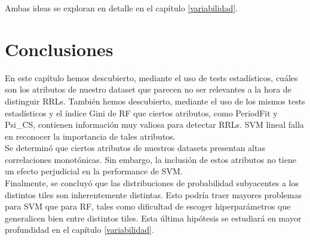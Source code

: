 Ambas ideas se exploran en detalle en el capítulo \ref{variabilidad}. 

\section{Conclusiones}

En este capítulo hemos descubierto, mediante el uso de tests estadísticos, cuáles son los atributos de nuestro dataset que parecen no ser relevantes a la hora de distinguir RRLs. También hemos descubierto, mediante el uso de los mismos tests estadísticos y el índice Gini de RF que ciertos atributos, como PeriodFit y Psi\_CS, contienen información muy valiosa para detectar RRLs. SVM lineal falla en reconocer la importancia de tales atributos. \\

Se determinó que ciertos atributos de nuestros datasets presentan altas correlaciones monotónicas. Sin embargo, la inclusión de estos atributos no tiene un efecto perjudicial en la performance de SVM. \\

Finalmente, se concluyó que las distribuciones de probabilidad subyacentes a los distintos tiles son inherentemente distintas. Esto podría traer mayores problemas para SVM que para RF, tales como dificultad de escoger hiperparámetros que generalicen bien entre distintos tiles. Esta última hipótesis se estudiará en mayor profundidad en el capítulo \ref{variabilidad}.\\


